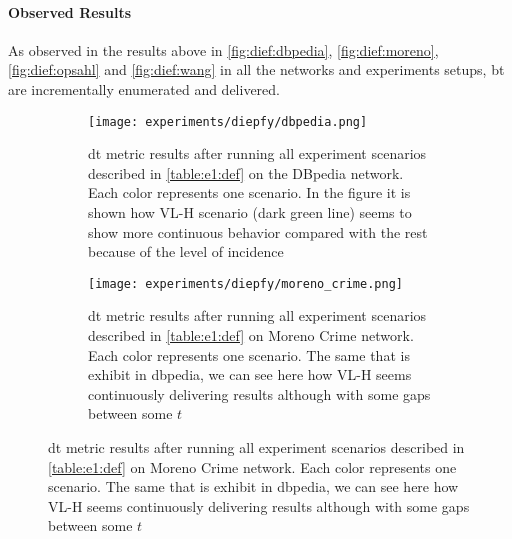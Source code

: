  \paragraph{Observed Results}\label{sub:sec:res:e1}
 As observed in the results above in \autoref{fig:dief:dbpedia}, \autoref{fig:dief:moreno}, \autoref{fig:dief:opsahl} and \autoref{fig:dief:wang} in all the networks and experiments setups, \acrshort{bt} are incrementally enumerated and delivered. 

 \begin{figure}[!htp]
  \centering
  \begin{subfigure}[t]{0.45\textwidth}
   \texttt{[image: experiments/diepfy/dbpedia.png]}
    \caption[{[EE] \acrshort{dt} Results: \acrshort{dbpedia}}]{\acrshort{dt} metric results after running all experiment scenarios described in \autoref{table:e1:def} on the DBpedia network. Each color represents one scenario. In the figure it is shown how VL-H scenario (dark green line) seems to show more continuous behavior compared with the rest because of the level of incidence}
    \label{fig:dief:dbpedia}
  \end{subfigure}\hfill
  \begin{subfigure}[t]{0.45\textwidth}
   \texttt{[image: experiments/diepfy/moreno\_crime.png]}
    \caption[{[EE] \acrshort{dt} Results: Moreno Crime}]{\acrshort{dt} metric results after running all experiment scenarios described in \autoref{table:e1:def} on Moreno Crime network. Each color represents one scenario. The same that is exhibit in dbpedia, we can see here how VL-H seems continuously delivering results although with some gaps between some $t$}
    \label{fig:dief:moreno}
  \end{subfigure}
  \vspace{0.5cm}


\end{figure}
